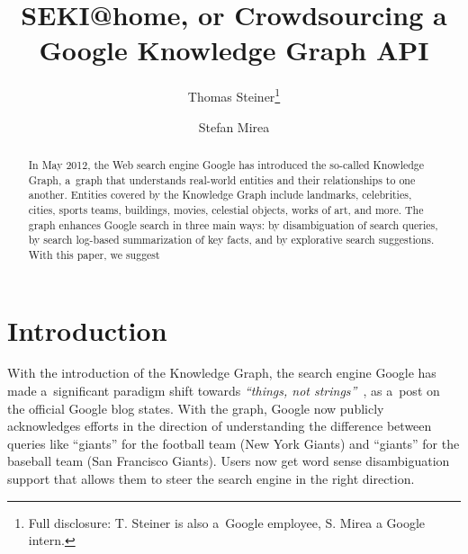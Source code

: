 \documentclass[runningheads,a4paper]{llncs}
\begin{document}
\title{SEKI@home, or Crowdsourcing a Google Knowledge Graph API}

\author{
  Thomas Steiner\thanks{Full disclosure: T. Steiner is also a~Google employee, S. Mirea a Google intern.} \and
  Stefan Mirea
}


\maketitle
\setcounter{footnote}{0}

\begin{abstract}
In May 2012, the Web search engine Google has introduced the so-called Knowledge Graph,
a~graph that understands real-world entities and their relationships to one another.
Entities covered by the Knowledge Graph include landmarks, celebrities, cities, sports
teams, buildings, movies, celestial objects, works of art, and more.
The graph enhances Google search in three main ways:
by disambiguation of search queries,
by search log-based summarization of key facts,
and by explorative search suggestions.
With this paper, we suggest 
\end{abstract}

\section{Introduction}
With the introduction of the Knowledge Graph, the search engine Google
has made a~significant paradigm shift towards \textit{``things, not strings''}~\cite{singhal2012},
as a~post on the official Google blog states.
With the graph, Google now publicly acknowledges efforts in the direction of 
understanding the difference between queries like ``giants''
for the football team (New York Giants)
and ``giants'' for the baseball team (San Francisco Giants).
Users now get word sense disambiguation support that allows them
to steer the search engine in the right direction.
\end{document}
